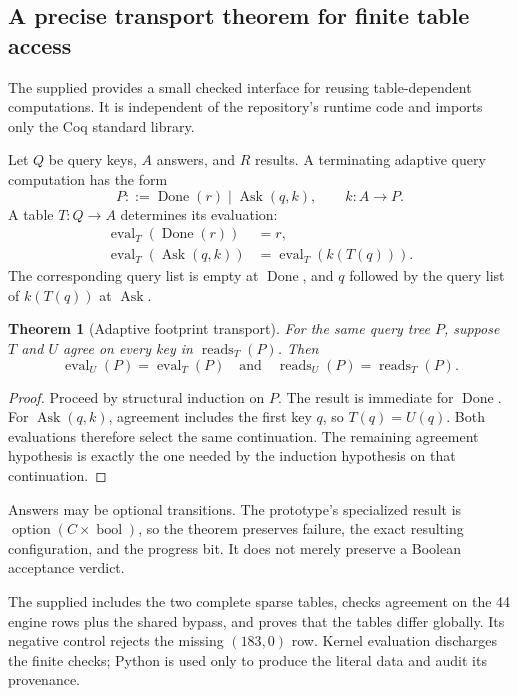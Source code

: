 \documentclass[11pt,a4paper]{article}
\newcommand{\code}[1]{\texttt{\detokenize{#1}}}
\newcommand{\reads}{\operatorname{reads}}
\newcommand{\eval}{\operatorname{eval}}
\newtheorem{theorem}{Theorem}[section]
\theoremstyle{remark}
\begin{document}
\subsection{A precise transport theorem for finite table access}
\label{sec:footprint}
The supplied \code{OracleFootprint.v} provides a small checked interface
for reusing table-dependent computations. It is independent of the
repository's runtime code and imports only the Coq standard library.

Let \(Q\) be query keys, \(A\) answers, and \(R\) results.
A terminating adaptive query computation has the form
\[
 P ::= \operatorname{Done}(r)
       \mid \operatorname{Ask}(q,k),\qquad k:A\to P.
\]
A table \(T:Q\to A\) determines its evaluation:
\begin{align*}
 \eval_T(\operatorname{Done}(r))&=r,\\
 \eval_T(\operatorname{Ask}(q,k))&=\eval_T(k(T(q))).
\end{align*}
The corresponding query list is empty at \(\operatorname{Done}\), and
\(q\) followed by the query list of \(k(T(q))\) at \(\operatorname{Ask}\).

\begin{theorem}[Adaptive footprint transport]
\label{thm:footprint}
For the same query tree \(P\), suppose \(T\) and \(U\) agree on every key in
\(\reads_T(P)\). Then
\[
 \eval_U(P)=\eval_T(P)
 \quad\text{and}\quad
 \reads_U(P)=\reads_T(P).
\]
\end{theorem}
\begin{proof}
Proceed by structural induction on \(P\). The result is immediate for
\(\operatorname{Done}\). For \(\operatorname{Ask}(q,k)\), agreement includes
the first key \(q\), so \(T(q)=U(q)\). Both evaluations therefore select the
same continuation. The remaining agreement hypothesis is exactly the one
needed by the induction hypothesis on that continuation.
\end{proof}
Answers may be optional transitions. The prototype's specialized result is
\(\operatorname{option}(C\times\operatorname{bool})\), so the theorem
preserves failure, the exact resulting configuration, and the progress bit.
It does not merely preserve a Boolean acceptance verdict.

The supplied \code{Support215217.v} includes the two complete sparse tables,
checks agreement on the 44 engine rows plus the shared bypass, and proves
that the tables differ globally. Its negative control rejects the missing
\((183,0)\) row. Kernel evaluation discharges the finite checks; Python is
used only to produce the literal data and audit its provenance.
\end{document}
